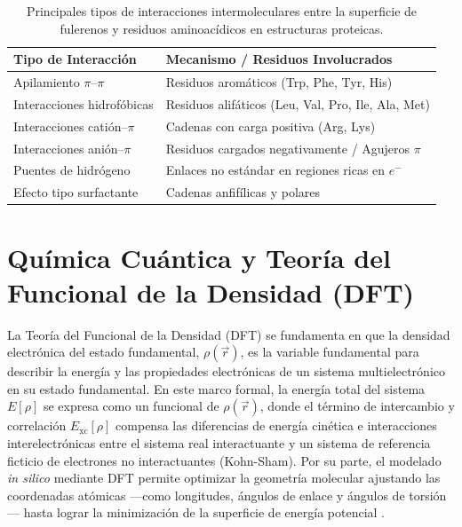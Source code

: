 \begin{table}[H]
\centering
\caption{Principales tipos de interacciones intermoleculares entre la superficie de fulerenos y residuos aminoacídicos en estructuras proteicas.}
\label{tab:interacciones_fulereno}
\begin{tabular}{l l}
\toprule
\textbf{Tipo de Interacción} & \textbf{Mecanismo / Residuos Involucrados} \\
\midrule
Apilamiento $\pi$--$\pi$ & Residuos aromáticos (Trp, Phe, Tyr, His) \\
Interacciones hidrofóbicas & Residuos alifáticos (Leu, Val, Pro, Ile, Ala, Met) \\
Interacciones catión--$\pi$ & Cadenas con carga positiva (Arg, Lys) \\
Interacciones anión--$\pi$ & Residuos cargados negativamente / Agujeros $\pi$ \\
Puentes de hidrógeno & Enlaces no estándar en regiones ricas en $e^-$ \\
Efecto tipo surfactante & Cadenas anfifílicas y polares \\
\bottomrule
\end{tabular}
\end{table}

\section{Química Cuántica y Teoría del Funcional de la Densidad (DFT)}
La Teoría del Funcional de la Densidad (DFT) se fundamenta en que la densidad electrónica del estado fundamental, $\rho(\vec{r})$, es la variable fundamental para describir la energía y las propiedades electrónicas de un sistema multielectrónico en su estado fundamental. En este marco formal, la energía total del sistema $E[\rho]$ se expresa como un funcional de $\rho(\vec{r})$, donde el término de intercambio y correlación $E_{\text{xc}}[\rho]$ compensa las diferencias de energía cinética e interacciones interelectrónicas entre el sistema real interactuante y un sistema de referencia ficticio de electrones no interactuantes (Kohn-Sham). Por su parte, el modelado \textit{in silico} mediante DFT permite optimizar la geometría molecular ajustando las coordenadas atómicas —como longitudes, ángulos de enlace y ángulos de torsión— hasta lograr la minimización de la superficie de energía potencial \cite{kohn1965self}.

